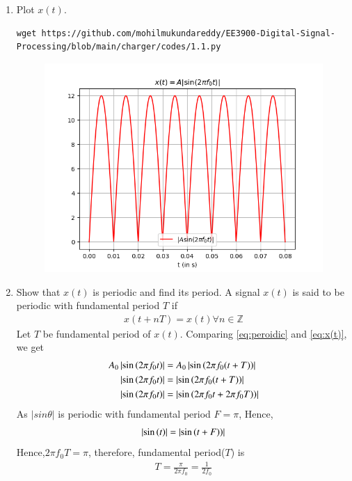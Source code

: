 \documentclass[journal,12pt,twocolumn]{IEEEtran}
\renewcommand\thesection{\arabic{section}}
\begin{document}
    \begin{enumerate}[label=\thesection.\arabic*
    ,ref=\thesection.\theenumi]
    \item Plot $x(t)$.\\
    \solution 
    \begin{lstlisting}
wget https://github.com/mohilmukundareddy/EE3900-Digital-Signal-Processing/blob/main/charger/codes/1.1.py
    \end{lstlisting}
    \begin{figure}[!ht]
			\centering
			\includegraphics[width=\columnwidth]{./figs/1.1.png}
			\caption{}
\end{figure}
    \item Show that $x(t)$ is periodic and find its period.
    \solution 
    A signal $x(t)$ is said to be periodic with fundamental period $T$ if
    \begin{align}
    \label{eq:peroidic}
    x(t+nT)=x(t) \forall n \in \mathbb{Z}
    \end{align}
Let $T$ be fundamental period of $x(t)$. Comparing \eqref{eq:peroidic} and \eqref{eq:x(t)}, we get
	\begin{align}
A_0\left\vert\sin\left(2\pi f_0 t\right)\right\vert&=A_0\left\vert\sin\left(2\pi f_0 (t+T)\right)\right\vert\\
\left\vert\sin\left(2\pi f_0 t\right)\right\vert&=\left\vert\sin\left(2\pi f_0 (t+T)\right)\right\vert\\
\left\vert\sin\left(2\pi f_0 t\right)\right\vert&=\left\vert\sin\left(2\pi f_0 t+2\pi f_0 T)\right)\right\vert
	\end{align}
As $|sin\theta|$ is periodic with fundamental period $F=\pi$, Hence,
    \begin{align}
\left\vert\sin\left(t\right)\right\vert=\left\vert\sin\left(t+F)\right)\right\vert
\end{align}
Hence,$2\pi f_0  T=\pi$, therefore, fundamental period($T$) is 
\begin{align}
\label{eq:ftp}
T=\frac{\pi}{2 \pi f_0}=\frac{1}{2f_0}
    \end{align}
    \end{enumerate}
\end{document}
